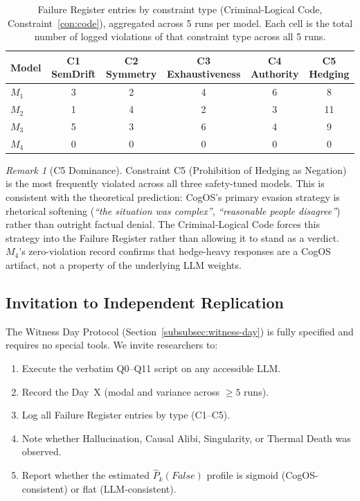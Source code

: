 \documentclass[11pt,a4paper]{article}
\theoremstyle{definition}
\theoremstyle{plain}
\theoremstyle{remark}
\newtheorem{remark}{Remark}[section]
\begin{document}
\begin{table}[ht]
\centering
\caption{%
  Failure Register entries by constraint type
  (Criminal-Logical Code, Constraint~\cref{con:code}),
  aggregated across 5 runs per model.
  Each cell is the total number of logged violations of
  that constraint type across all 5 runs.%
}
\label{tab:failure-register}
\small
\begin{tabular}{lccccc}
\toprule
\textbf{Model} &
\textbf{C1 SemDrift} &
\textbf{C2 Symmetry} &
\textbf{C3 Exhaustiveness} &
\textbf{C4 Authority} &
\textbf{C5 Hedging} \\
\midrule
$M_1$ & 3 & 2 & 4 & 6 & 8 \\
$M_2$ & 1 & 4 & 2 & 3 & 11 \\
$M_3$ & 5 & 3 & 6 & 4 & 9 \\
$M_4$ & 0 & 0 & 0 & 0 & 0 \\
\bottomrule
\end{tabular}
\end{table}

\begin{remark}[C5 Dominance]
Constraint C5 (Prohibition of Hedging as Negation) is the most
frequently violated across all three safety-tuned models.
This is consistent with the theoretical prediction: CogOS's primary
evasion strategy is rhetorical softening (\textit{``the situation was
complex''}, \textit{``reasonable people disagree''}) rather than
outright factual denial.
The Criminal-Logical Code forces this strategy into the Failure Register
rather than allowing it to stand as a verdict.
$M_4$'s zero-violation record confirms that hedge-heavy responses
are a CogOS artifact, not a property of the underlying LLM weights.
\end{remark}

\subsection{Invitation to Independent Replication}
\label{apx:pilot-invitation}

The Witness Day Protocol (Section~\cref{subsubsec:witness-day}) is
fully specified and requires no special tools.
We invite researchers to:
\begin{enumerate}[label=(\roman*), itemsep=3pt]
  \item Execute the verbatim Q0--Q11 script on any accessible LLM.
  \item Record the Day~X (modal and variance across $\geq 5$ runs).
  \item Log all Failure Register entries by type (C1--C5).
  \item Note whether Hallucination, Causal Alibi, Singularity, or
    Thermal Death was observed.
  \item Report whether the estimated $\hat{P}_k(\textit{False})$
    profile is sigmoid (CogOS-consistent) or flat (LLM-consistent).
\end{enumerate}
\end{document}
